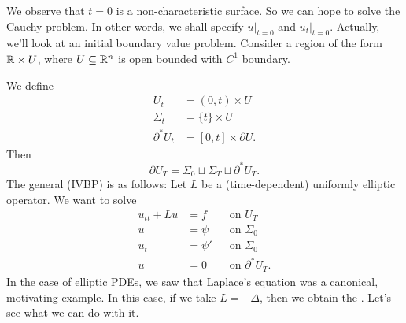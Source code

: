 \documentclass[a4paper]{article}
\begin{document}
We observe that $t = 0$ is a non-characteristic surface. So we can hope to solve the Cauchy problem. In other words, we shall specify $u|_{t = 0}$ and $u_t|_{t = 0}$. Actually, we'll look at an initial boundary value problem. Consider a region of the form $\mathbb{R} \times U$, where $U \subseteq \mathbb{R}^n$ is open bounded with $C^1$ boundary.
\begin{center}
\end{center}
We define
\begin{align*}
  U_t &= (0, t) \times U\\
  \Sigma_t &= \{t\} \times U\\
  \partial^* U_t &= [0, t] \times \partial U.
\end{align*}
Then
\[
  \partial U_T = \Sigma_0 \sqcup \Sigma_T \sqcup \partial^* U_T.
\]
The general  (IVBP) is as follows: Let $L$ be a (time-dependent) uniformly elliptic operator. We want to solve
\begin{align*}
  u_{tt} + L u &= f && \text{on }U_T\\
  u &= \psi &&\text{on }\Sigma_0\\
  u_t &= \psi' && \text{on }\Sigma_0\\
  u &= 0 && \text{on } \partial^* U_T.
\end{align*}
In the case of elliptic PDEs, we saw that Laplace's equation was a canonical, motivating example. In this case, if we take $L = - \Delta$, then we obtain the . Let's see what we can do with it.
\end{document}
